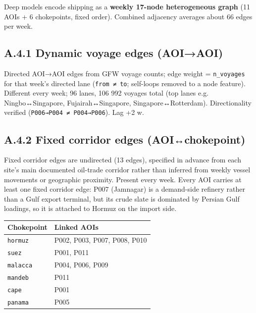 \documentclass[
  british,
  12pt,
  oneside]{book}
\newcounter{none} %
\begin{document}
{Deep models encode shipping as a \textbf{weekly 17-node heterogeneous graph}
(11 AOIs + 6 chokepoints, fixed order). Combined adjacency averages about 66
edges per week.

\subsection*{A.4.1 Dynamic voyage edges (AOI→AOI)}\label{a.4.1-dynamic-voyage-edges-aoiaoi}

Directed AOI→AOI edges from GFW voyage counts; edge weight = \texttt{n\_voyages} for
that week's directed lane (\texttt{from\ ≠\ to}; self-loops removed to a node feature).
Different every week; 96 lanes, 106 992 voyages total (top lanes e.g.
Ningbo↔Singapore, Fujairah↔Singapore, Singapore↔Rotterdam). Directionality
verified (\texttt{P006→P004\ ≠\ P004→P006}). Lag +2 w.

\subsection*{A.4.2 Fixed corridor edges (AOI↔chokepoint)}\label{a.4.2-fixed-corridor-edges-aoichokepoint}

Fixed corridor edges are undirected (13 edges), specified in advance from
each site's main documented oil-trade corridor rather than inferred from weekly
vessel movements or geographic proximity. Present every week.
Every AOI carries at least one fixed corridor edge: P007 (Jamnagar) is a demand-side
refinery rather than a Gulf export terminal, but its crude slate is dominated by
Persian Gulf loadings, so it is attached to Hormuz on the import side.

{\def\LTcaptype{none} %
\begin{longtable}[]{@{}ll@{}}
\toprule\noalign{}
Chokepoint & Linked AOIs \\
\midrule\noalign{}
\endhead
\bottomrule\noalign{}
\endlastfoot
\texttt{hormuz} & P002, P003, P007, P008, P010 \\
\texttt{suez} & P001, P011 \\
\texttt{malacca} & P004, P006, P009 \\
\texttt{mandeb} & P011 \\
\texttt{cape} & P001 \\
\texttt{panama} & P005 \\
\end{longtable}
}

}
\end{document}
